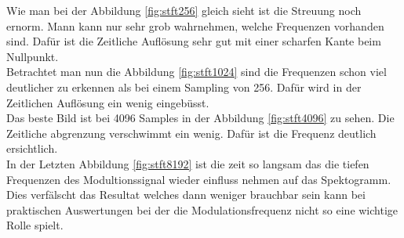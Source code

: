 Wie man bei der Abbildung \ref{fig:stft256} gleich sieht ist die Streuung noch ernorm. Mann kann nur sehr grob wahrnehmen, welche Frequenzen vorhanden sind. Dafür ist die Zeitliche Auflösung sehr gut mit einer scharfen Kante beim Nullpunkt. \\

Betrachtet man nun die Abbildung \ref{fig:stft1024} sind die Frequenzen schon viel deutlicher zu erkennen als bei einem Sampling von 256. Dafür wird in der Zeitlichen Auflösung ein wenig eingebüsst.\\

Das beste Bild ist bei 4096 Samples in der Abbildung \ref{fig:stft4096} zu sehen. Die Zeitliche abgrenzung verschwimmt ein wenig. Dafür ist die Frequenz deutlich ersichtlich.\\

In der Letzten Abbildung \ref{fig:stft8192} ist die zeit so langsam das die tiefen Frequenzen des Modultionssignal wieder einfluss nehmen auf das Spektogramm. Dies verfälscht das Resultat welches dann weniger brauchbar sein kann bei praktischen Auswertungen bei der die Modulationsfrequenz nicht so eine wichtige Rolle spielt.\\







